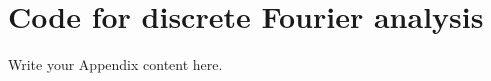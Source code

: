 
\chapter{Code for discrete Fourier analysis} %

\label{code} %


Write your Appendix content here.
